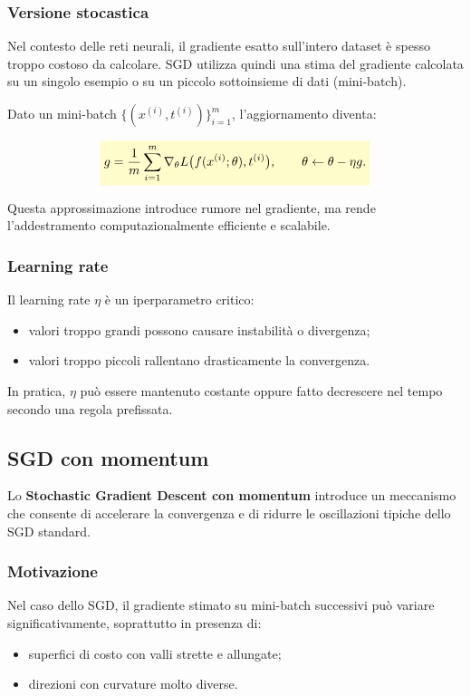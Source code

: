 \documentclass[a4paper,12pt]{report}
\newcommand{\highlight}[1]{%
\colorbox{yellow!20}{$\displaystyle #1$}%
}
\begin{document}
\subsubsection{Versione stocastica}

Nel contesto delle reti neurali, il gradiente esatto sull’intero dataset è spesso troppo costoso da calcolare.  
SGD utilizza quindi una stima del gradiente calcolata su un singolo esempio o su un piccolo sottoinsieme di dati (mini-batch).

Dato un mini-batch $\{(x^{(i)}, t^{(i)})\}_{i=1}^{m}$, l’aggiornamento diventa:

\[
\highlight{
g = \frac{1}{m} \sum_{i=1}^{m} \nabla_{\theta} L\bigl(f(x^{(i)};\theta), t^{(i)}\bigr),
\qquad
\theta \leftarrow \theta - \eta g.}
\]

Questa approssimazione introduce rumore nel gradiente, ma rende l’addestramento computazionalmente efficiente e scalabile.

\subsubsection{Learning rate}

Il learning rate $\eta$ è un iperparametro critico:
\begin{itemize}
    \item valori troppo grandi possono causare instabilità o divergenza;
    \item valori troppo piccoli rallentano drasticamente la convergenza.
\end{itemize}

In pratica, $\eta$ può essere mantenuto costante oppure fatto decrescere nel tempo secondo una regola prefissata.

\subsection{SGD con momentum}

Lo \textbf{Stochastic Gradient Descent con momentum} introduce un meccanismo che consente di accelerare la convergenza e di ridurre le oscillazioni tipiche dello SGD standard.

\subsubsection{Motivazione}

Nel caso dello SGD, il gradiente stimato su mini-batch successivi può variare significativamente, soprattutto in presenza di:
\begin{itemize}
    \item superfici di costo con valli strette e allungate;
    \item direzioni con curvature molto diverse.
\end{itemize}
\end{document}
